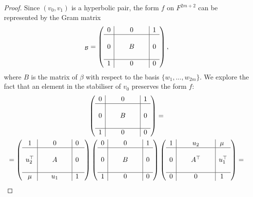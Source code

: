 \begin{proof}
    Since $(v_0,v_1)$ is a 
    hyperbolic pair, the form $f$ on $F^{2m+2}$ can be represented by the Gram matrix
    \begin{equation*}
	[f]_{\mathcal{B}} = \left(
	    \begin{array}{c|c|c}
		0 & 0 & 1  \\ \hline 
		 & & \\
		0 &\ \ \ \ \ B\ \ \ \ \  & 0 \\ 
		 & & \\ \hline 
		1 & 0 & 0 
	    \end{array}
	\right),
    \end{equation*}
    where $B$ is the matrix of $\beta$ with respect to the basis 
    $\{ w_1 , ..., w_{2m} \}$. 
    We explore the fact that an element in the stabiliser of $v_0$ preserves the 
    form $f$:
    \begin{multline*}
	\left(
	    \begin{array}{c|c|c}
		0 & 0 & 1  \\ \hline 
		 & & \\
		0 &\ \ \ \ \ B\ \ \ \ \  & 0 \\ 
		 & & \\ \hline 
		1 & 0 & 0 
	    \end{array}
	\right) =\\
	= \left(
	    \begin{array}{c|c|c}
		1 & 0 & 0\  \\ \hline 
		 & & \\
		u_2^\T &\ \ \ \ \ A\ \ \ \ \  & 0\  \\ 
		 & & \\ \hline 
		\mu & u_1 & 1\ 
	    \end{array}
	\right)
	\left(
	    \begin{array}{c|c|c}
		0 & 0 & 1  \\ \hline 
		 & & \\
		0 &\ \ \ \ \ B\ \ \ \ \  & 0 \\ 
		 & & \\ \hline 
		1 & 0 & 0 
	    \end{array}
	\right)
	\left(
	    \begin{array}{c|c|c}
		1 & u_2 & \mu\  \\ \hline 
		 & & \\
		0 &\ \ \ \ \ A^\T\ \ \ \ \  & u_1^\T  \\ 
		 & & \\ \hline 
		0 & 0 & 1\  
	    \end{array}
	\right) =
    \end{multline*}

\end{proof}
